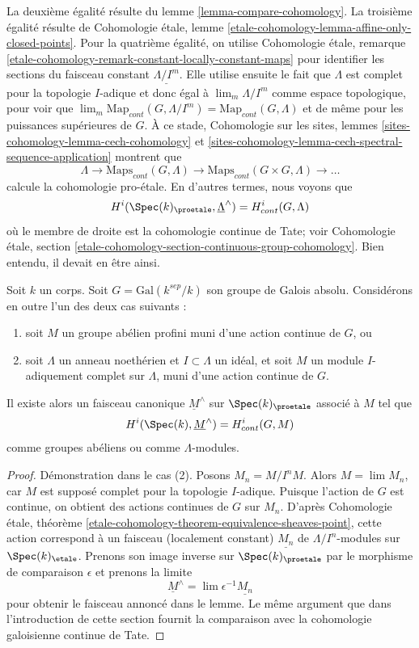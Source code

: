 La deuxième égalité résulte du lemme \ref{lemma-compare-cohomology}.
La troisième égalité résulte de Cohomologie \'etale, lemme
\ref{etale-cohomology-lemma-affine-only-closed-points}.
Pour la quatrième égalité, on utilise
Cohomologie \'etale, remarque
\ref{etale-cohomology-remark-constant-locally-constant-maps}
pour identifier les sections du faisceau constant $\underline{\Lambda/I^m}$.
Elle utilise ensuite le fait que $\Lambda$ est complet pour la topologie $I$-adique
et donc égal à $\lim_m \Lambda/I^m$ comme espace topologique, pour voir que
$\lim_m \text{Map}_{cont}(G, \Lambda/I^m) = \text{Map}_{cont}(G, \Lambda)$
et de même pour les puissances supérieures de $G$.
À ce stade, Cohomologie sur les sites, lemmes
\ref{sites-cohomology-lemma-cech-cohomology}  et
\ref{sites-cohomology-lemma-cech-spectral-sequence-application}
montrent que
$$
\Lambda \to \text{Maps}_{cont}(G, \Lambda) \to
\text{Maps}_{cont}(G \times G, \Lambda) \to \ldots
$$
calcule la cohomologie pro-\'etale. En d'autres termes, nous voyons que
$$
H^i(\Spec(k)_\proetale, \underline{\Lambda}^\wedge)
=
H^i_{cont}(G, \Lambda)
$$
où le membre de droite est la cohomologie continue de Tate; voir
Cohomologie \'etale, section
\ref{etale-cohomology-section-continuous-group-cohomology}.
Bien entendu, il devait en être ainsi.

\begin{lemma}
\label{lemma-more-general-point}
Soit $k$ un corps. Soit $G = \text{Gal}(k^{sep}/k)$ son groupe de
Galois absolu. Considérons en outre l'un des deux cas suivants :
\begin{enumerate}
\item soit $M$ un groupe abélien profini muni d'une action continue
de $G$, ou
\item soit $\Lambda$ un anneau noethérien et $I \subset \Lambda$ un idéal,
et soit $M$ un module $I$-adiquement complet sur $\Lambda$, muni d'une action continue
de $G$.
\end{enumerate}
Il existe alors un faisceau canonique $\underline{M}^\wedge$ sur
$\Spec(k)_\proetale$ associé à $M$ tel que
$$
H^i(\Spec(k), \underline{M}^\wedge) = H^i_{cont}(G, M)
$$
comme groupes abéliens ou comme $\Lambda$-modules.
\end{lemma}

\begin{proof}
Démonstration dans le cas (2). Posons $M_n = M/I^nM$. Alors $M = \lim M_n$, car $M$ est
supposé complet pour la topologie $I$-adique. Puisque l'action de $G$ est continue,
on obtient des actions continues de $G$ sur $M_n$. D'après Cohomologie \'etale, théorème
\ref{etale-cohomology-theorem-equivalence-sheaves-point},
cette action correspond à un faisceau (localement constant)
$\underline{M_n}$ de $\Lambda/I^n$-modules sur $\Spec(k)_\etale$.
Prenons son image inverse sur $\Spec(k)_\proetale$ par le morphisme de comparaison
$\epsilon$ et prenons la limite
$$
\underline{M}^\wedge = \lim \epsilon^{-1}\underline{M_n}
$$
pour obtenir le faisceau annoncé dans le lemme. Le même argument que
dans l'introduction de cette section fournit la comparaison
avec la cohomologie galoisienne continue de Tate.
\end{proof}






